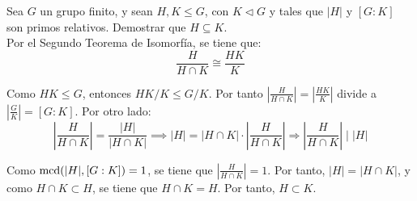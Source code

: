 \begin{ejercicio}
    Sea $G$ un grupo finito, y sean $H,K\leq G$, con $K\lhd G$ y tales que $|H|$ y $[G:K]$ son primos relativos. Demostrar que $H\subseteq K$.\\
    
    Por el Segundo Teorema de Isomorfía, se tiene que:
    \begin{equation*}
        \dfrac{H}{H\cap K} \cong \dfrac{HK}{K}
    \end{equation*}

    Como $HK\leq G$, entonces $HK/K \leq G/K$. Por tanto $\left|\frac{H}{H\cap K}\right| = \left|\frac{HK}{K}\right|$ divide a $\left|\frac{G}{K}\right| = [G:K]$. Por otro lado:
    \begin{equation*}
        \left|\frac{H}{H\cap K}\right| = \dfrac{|H|}{|H\cap K|} \implies |H| = |H\cap K|\cdot \left|\frac{H}{H\cap K}\right|\Longrightarrow \left|\frac{H}{H\cap K}\right| \mid |H|
    \end{equation*}

    Como $\operatorname{mcd}(|H|,[G:K])=1$, se tiene que $\left|\frac{H}{H\cap K}\right|=1$. Por tanto, $|H|=|H\cap K|$, y como $H\cap K\subset H$, se tiene que $H\cap K=H$. Por tanto, $H\subset K$.
\end{ejercicio}

